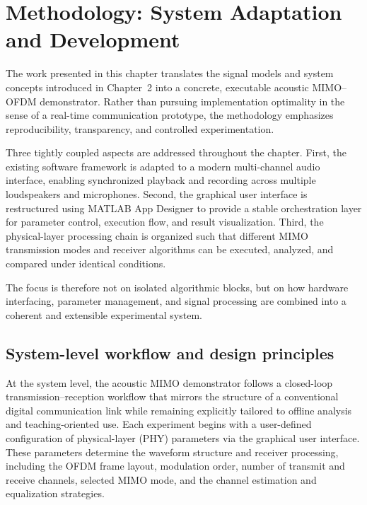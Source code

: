 
\section{Methodology: System Adaptation and Development}
\label{ch:methodology}

The work presented in this chapter translates the signal models and system concepts introduced in Chapter~2 into a concrete, executable acoustic MIMO--OFDM demonstrator. Rather than pursuing implementation optimality in the sense of a real-time communication prototype, the methodology emphasizes reproducibility, transparency, and controlled experimentation. 

Three tightly coupled aspects are addressed throughout the chapter. First, the existing software framework is adapted to a modern multi-channel audio interface, enabling synchronized playback and recording across multiple loudspeakers and microphones. Second, the graphical user interface is restructured using MATLAB App Designer to provide a stable orchestration layer for parameter control, execution flow, and result visualization. Third, the physical-layer processing chain is organized such that different MIMO transmission modes and receiver algorithms can be executed, analyzed, and compared under identical conditions.

The focus is therefore not on isolated algorithmic blocks, but on how hardware interfacing, parameter management, and signal processing are combined into a coherent and extensible experimental system.

\subsection{System-level workflow and design principles}
\label{sec:sys_workflow}

At the system level, the acoustic MIMO demonstrator follows a closed-loop transmission--reception workflow that mirrors the structure of a conventional digital communication link while remaining explicitly tailored to offline analysis and teaching-oriented use. Each experiment begins with a user-defined configuration of physical-layer (PHY) parameters via the graphical user interface. These parameters determine the waveform structure and receiver processing, including the OFDM frame layout, modulation order, number of transmit and receive channels, selected MIMO mode, and the channel estimation and equalization strategies.


